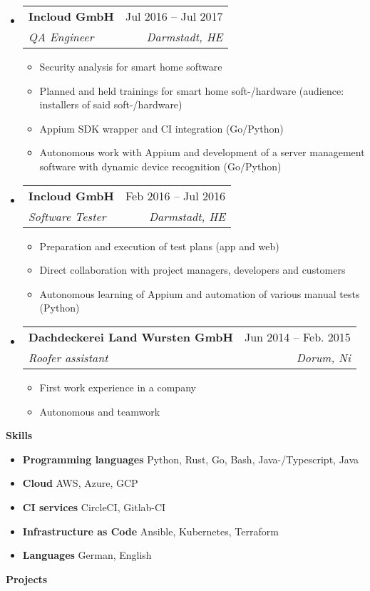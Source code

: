 \documentclass[letterpaper,12pt]{article}[leftmargin=*]
\makeatletter
\def \entryspacing {-0pt}
\renewcommand{\section}[2]{\vspace{5pt}
  \colorbox{secondary}{\color{white}\raggedbottom\normalsize\textbf{{#1}{\hspace{7pt}#2}}}
}
\newcommand{\resumeEntryStart}{\begin{itemize}[leftmargin=2.5mm]}
\newcommand{\resumeEntryEnd}{\end{itemize}\vspace{\entryspacing}}
\newcommand{\resumeItemListStart}{\begin{itemize}[leftmargin=4.5mm]}
\newcommand{\resumeItemListEnd}{\end{itemize}}
\newcommand{\resumeItem}[1]{
  \item\small{
    {#1 \vspace{-2pt}}
  }
}
\newcommand{\resumeEntryTSDL}[4]{
  \vspace{-1pt}\item[]
    \begin{tabular*}{0.97\textwidth}{l@{\extracolsep{\fill}}r}
      \textbf{\color{primary}#1} & {\firabook\color{accent}\small#2} \\
      \textit{\color{accent}\small#3} & \textit{\color{accent}\small#4} \\
    \end{tabular*}\vspace{-6pt}
}
\newcommand{\resumeEntryS}[2]{
  \item[]\small{
    \textbf{\color{primary}#1 }{ #2 \vspace{-6pt}}
  }
}
\makeatother
\begin{document}
  \resumeEntryStart
    \resumeEntryTSDL
      {Incloud GmbH}{Jul 2016 -- Jul 2017}
      {QA Engineer}{Darmstadt, HE}
    \resumeItemListStart
      \resumeItem {Security analysis for smart home software}
      \resumeItem {Planned and held trainings for smart home soft-/hardware (audience: installers of said soft-/hardware)}
      \resumeItem {Appium SDK wrapper and CI integration (Go/Python)}
      \resumeItem {Autonomous work with Appium and development of a server management software with dynamic device recognition (Go/Python)}
    \resumeItemListEnd
  \resumeEntryEnd
  
  \resumeEntryStart
    \resumeEntryTSDL
      {Incloud GmbH}{Feb 2016 -- Jul 2016}
      {Software Tester}{Darmstadt, HE}
    \resumeItemListStart
      \resumeItem {Preparation and execution of test plans (app and web)}
      \resumeItem {Direct collaboration with project managers, developers and customers}
      \resumeItem {Autonomous learning of Appium and automation of various manual tests (Python)}
    \resumeItemListEnd
  \resumeEntryEnd

  \resumeEntryStart
    \resumeEntryTSDL
      {Dachdeckerei Land Wursten GmbH}{Jun 2014 -- Feb. 2015}
      {Roofer assistant}{Dorum, Ni}
    \resumeItemListStart
      \resumeItem {First work experience in a company}
      \resumeItem {Autonomous and teamwork}
    \resumeItemListEnd
  \resumeEntryEnd


\section{\faGears}{Skills}
 \resumeEntryStart
  \resumeEntryS{Programming languages} {Python, Rust, Go, Bash, Java-/Typescript, Java}
  \resumeEntryS{Cloud}{AWS, Azure, GCP}
  \resumeEntryS{CI services}{CircleCI, Gitlab-CI}
  \resumeEntryS{Infrastructure as Code}{Ansible, Kubernetes, Terraform}
  \resumeEntryS{Languages} {German, English}
 \resumeEntryEnd

\section{\faFlask}{Projects}
\end{document}
